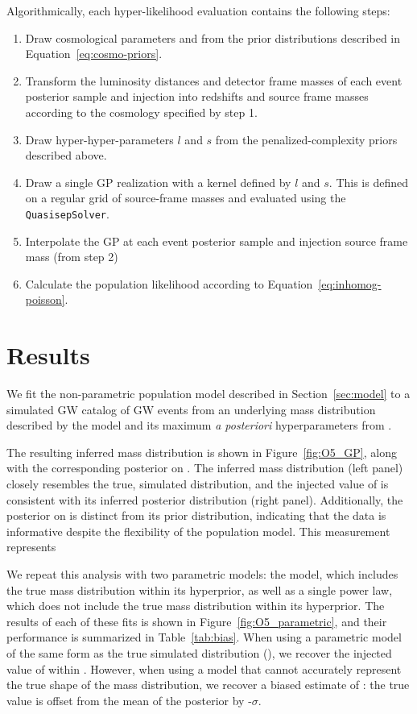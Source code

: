 \documentclass[]{aastex631}
\begin{document}
Algorithmically, each hyper-likelihood evaluation contains the following steps:
\begin{enumerate}
    \item Draw cosmological parameters \Ho{} and \Omm{} from the prior distributions described in Equation~\ref{eq:cosmo-priors}.
    \item Transform the luminosity distances and detector frame masses of each event posterior sample and injection into redshifts and source frame masses according to the cosmology specified by step 1.
    \item Draw hyper-hyper-parameters $l$ and $s$ from the penalized-complexity priors described above.
    \item Draw a single GP realization with a kernel defined by $l$ and $s$. This is defined on a regular grid of source-frame masses and evaluated using the \texttt{QuasisepSolver}.
    \item Interpolate the GP at each event posterior sample and injection source frame mass (from step 2)
    \item Calculate the population likelihood according to Equation~\ref{eq:inhomog-poisson}.
\end{enumerate}


\section{Results}
\label{sec:results}
We fit the non-parametric population model described in Section~\ref{sec:model} to a simulated GW catalog of  GW events from an underlying mass distribution described by the \plp{} model and its maximum \emph{a posteriori} hyperparameters from \citet{o3b_pop}.

The resulting inferred mass distribution is shown in Figure~\ref{fig:O5_GP}, along with the corresponding posterior on \Ho.
The inferred mass distribution (left panel) closely resembles the true, simulated distribution, and the injected value of \Ho is consistent with its inferred posterior distribution (right panel).
Additionally, the posterior on \Ho is distinct from its prior distribution, indicating that the data is informative despite the flexibility of the population model.
This measurement represents 

We repeat this analysis with two parametric models: the \plp{} model, which includes the true mass distribution within its hyperprior, as well as a single power law, which does not include the true mass distribution within its hyperprior.
The results of each of these fits is shown in Figure~\ref{fig:O5_parametric}, and their performance is summarized in Table~\ref{tab:bias}.
When using a parametric model of the same form as the true simulated distribution (\plp), we recover the injected value of \Ho{} within .
However, when using a model that cannot accurately represent the true shape of the mass distribution, we recover a biased estimate of \Ho: the true value is offset from the mean of the posterior by -$\sigma$.
\end{document}
